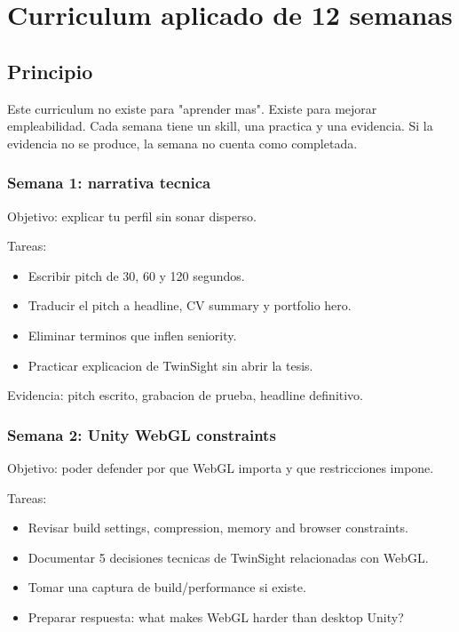\chapter{Curriculum aplicado de 12 semanas}

\section{Principio}


Este curriculum no existe para "aprender mas". Existe para mejorar empleabilidad. Cada semana tiene un skill, una practica y una evidencia. Si la evidencia no se produce, la semana no cuenta como completada.


\subsection{Semana 1: narrativa tecnica}


Objetivo: explicar tu perfil sin sonar disperso.


Tareas:


\begin{itemize}
\item Escribir pitch de 30, 60 y 120 segundos.
\item Traducir el pitch a headline, CV summary y portfolio hero.
\item Eliminar terminos que inflen seniority.
\item Practicar explicacion de TwinSight sin abrir la tesis.
\end{itemize}


Evidencia: pitch escrito, grabacion de prueba, headline definitivo.


\subsection{Semana 2: Unity WebGL constraints}


Objetivo: poder defender por que WebGL importa y que restricciones impone.


Tareas:


\begin{itemize}
\item Revisar build settings, compression, memory and browser constraints.
\item Documentar 5 decisiones tecnicas de TwinSight relacionadas con WebGL.
\item Tomar una captura de build/performance si existe.
\item Preparar respuesta: what makes WebGL harder than desktop Unity?
\end{itemize}


